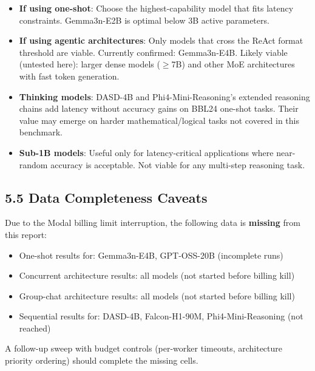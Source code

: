 \documentclass[11pt,letterpaper]{article}
\begin{document}
\begin{itemize}
  \item \textbf{If using one-shot}: Choose the highest-capability model that fits latency
    constraints. Gemma3n-E2B is optimal below 3B active parameters.
  \item \textbf{If using agentic architectures}: Only models that cross the ReAct format
    threshold are viable. Currently confirmed: Gemma3n-E4B. Likely viable (untested here):
    larger dense models ($\geq$7B) and other MoE architectures with fast token generation.
  \item \textbf{Thinking models}: DASD-4B and Phi4-Mini-Reasoning's extended reasoning chains
    add latency without accuracy gains on BBL24 one-shot tasks. Their value may emerge on
    harder mathematical/logical tasks not covered in this benchmark.
  \item \textbf{Sub-1B models}: Useful only for latency-critical applications where near-random
    accuracy is acceptable. Not viable for any multi-step reasoning task.
\end{itemize}

\subsection*{5.5 Data Completeness Caveats}

Due to the Modal billing limit interruption, the following data is \textbf{missing} from this
report:
\begin{itemize}
  \item One-shot results for: Gemma3n-E4B, GPT-OSS-20B (incomplete runs)
  \item Concurrent architecture results: all models (not started before billing kill)
  \item Group-chat architecture results: all models (not started before billing kill)
  \item Sequential results for: DASD-4B, Falcon-H1-90M, Phi4-Mini-Reasoning (not reached)
\end{itemize}

A follow-up sweep with budget controls (per-worker timeouts, architecture priority ordering)
should complete the missing cells.
\end{document}
